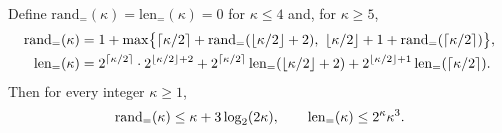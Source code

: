 \begin{lemma}\label{earlier:r:lem:rs-recursion}
Define \(\mathrm{rand}_=(\kappa)=\mathrm{len}_=(\kappa)=0\) for
\(\kappa\le4\) and, for \(\kappa\ge5\),
\[
\begin{aligned}
 \mathrm{rand}_=(\kappa)&=1+\max\bigl\{\left\lceil\kappa/2\right\rceil
 +\mathrm{rand}_=(\left\lfloor\kappa/2\right\rfloor+2),\
 \left\lfloor\kappa/2\right\rfloor+1+\mathrm{rand}_=(\left\lceil\kappa/2\right\rceil)\bigr\},\\
 \mathrm{len}_=(\kappa)&=2^{\left\lceil\kappa/2\right\rceil}\cdot2^{\left\lfloor\kappa/2\right\rfloor+2}
 +2^{\left\lceil\kappa/2\right\rceil}\,\mathrm{len}_=(\left\lfloor\kappa/2\right\rfloor+2)
 +2^{\left\lfloor\kappa/2\right\rfloor+1}\,\mathrm{len}_=(\left\lceil\kappa/2\right\rceil).
\end{aligned}
\]
Then for every integer \(\kappa\ge1\),
\[
 \mathrm{rand}_=(\kappa)\le\kappa+3\log_2(2\kappa),\qquad
 \mathrm{len}_=(\kappa)\le2^\kappa\kappa^3.
\]
\end{lemma}

